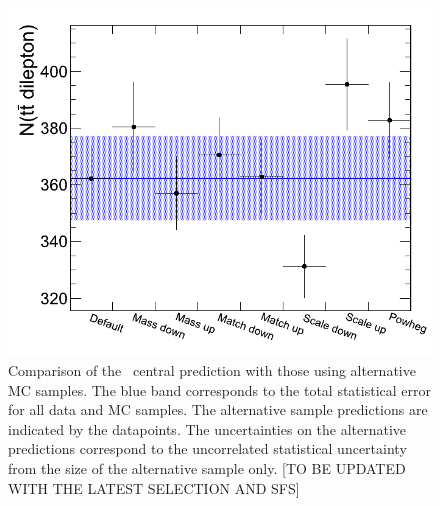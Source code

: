 \begin{figure}[hbt]
  \begin{center}
	\includegraphics[width=0.8\linewidth]{plots/n_dl_syst_comp.png}
	\caption{
	  \label{fig:ttllsyst}%
          Comparison of the \ttll\ central prediction with those using
          alternative MC samples. The blue band corresponds to the
          total statistical error for all data and MC samples. The
          alternative sample predictions are indicated by the
          datapoints. The uncertainties on the alternative predictions
          correspond to the uncorrelated statistical uncertainty from
          the size of the alternative sample only.
        [TO BE UPDATED WITH THE LATEST SELECTION AND SFS]}
      \end{center}
    \end{figure}

\clearpage

